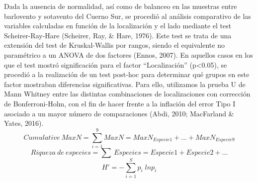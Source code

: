 \documentclass[a4paper, 11pt]{article}
\begin{document}
Dada la ausencia de normalidad, así como de balanceo en las muestras entre barlovento y sotavento del Cuerno Sur, se procedió al análisis comparativo de las variables calculadas en función de la localización y el lado mediante el test Scheirer-Ray-Hare (Scheirer, Ray, & Hare, 1976). Este test se trata de una extensión del test de Kruskal-Wallis por rangos, siendo el equivalente no paramétrico a un ANOVA de dos factores (Ennos, 2007). En aquellos casos en los que el test mostró significación para el factor “Localización” (p<0.05), se procedió a la realización de un test post-hoc para determinar qué grupos en este factor mostraban diferencias significativas. Para ello, utilizamos la prueba U de Mann Whitney entre las distintas combinaciones de localizaciones con corrección de Bonferroni-Holm, con el fin de hacer frente a la inflación del error Tipo I asociado a un mayor número de comparaciones (Abdi, 2010; MacFarland & Yates, 2016).
\begin{equation}
\label{CumMaxN}
Cumulative\: MaxN = \sum_{i=1}^9MaxN=MaxN_{Especie 1} + ... + MaxN_{Especie 9}
\end{equation}
\begin{equation}
\label{Richness} 
Riqueza\:de\:especies  = \sum\:Especies = Especie 1 + Especie 2 + ...
\end{equation}
\begin{equation}
\label{Shannon}
H'=-\sum_{i=1}^Sp_{i}\; lnp_{i}
\end{equation}
\end{document}
